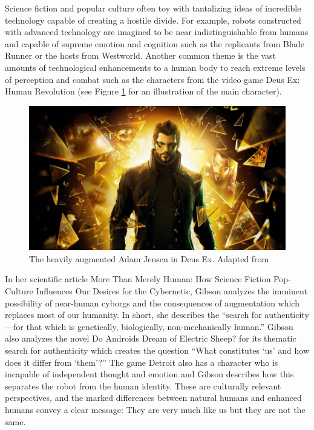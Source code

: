 \documentclass[10pt, oneside, letterpaper]{article}
\begin{document}
\begin{multicols}{2}
	Science fiction and popular culture often toy with tantalizing ideas of incredible technology capable of creating a hostile divide. For example, robots constructed with advanced technology are imagined to be near indistinguishable from humans and capable of supreme emotion and cognition such as the replicants from Blade Runner or the hosts from Westworld. Another common theme is the vast amounts of technological enhancements to a human body to reach extreme levels of perception and combat such as the characters from the video game Deus Ex: Human Revolution (see Figure \ref{fig:deus-ex} for an illustration of the main character).

	\begin{figure}[H]
		\centering
		\includegraphics[width=\linewidth]{deus-ex}
		\caption{The heavily augmented Adam Jensen in Deus Ex. Adapted from \protect\cite{Lieu2018}}
		\label{fig:deus-ex}
	\end{figure}

	In her scientific article More Than Merely Human: How Science Fiction Pop-Culture Influences Our Desires for the Cybernetic, Gibson \cite{Gibson2017} analyzes the imminent possibility of near-human cyborgs and the consequences of augmentation which replaces most of our humanity. In short, she describes the ``search for authenticity—for that which is genetically, biologically, non-mechanically human.'' Gibson also analyzes the novel Do Androids Dream of Electric Sheep? for its thematic search for authenticity which creates the question ``What constitutes `us' and how does it differ from `them'?'' The game Detroit also has a character who is incapable of independent thought and emotion and Gibson describes how this separates the robot from the human identity. These are culturally relevant perspectives, and the marked differences between natural humans and enhanced humans convey a clear message: They are very much like us but they are not the same.


\end{multicols}
\end{document}
